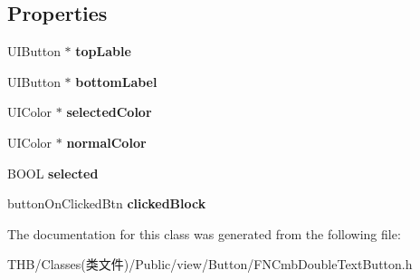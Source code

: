 \subsection*{Properties}
\begin{DoxyCompactItemize}
\item 
\mbox{\label{interface_f_n_cmb_double_text_button_af90e92dc486afb9f0e67654bdb69f14d}} 
U\+I\+Button $\ast$ {\bfseries top\+Lable}
\item 
\mbox{\label{interface_f_n_cmb_double_text_button_ac32549056770869dd4db3180583a424e}} 
U\+I\+Button $\ast$ {\bfseries bottom\+Label}
\item 
\mbox{\label{interface_f_n_cmb_double_text_button_a521c9c4870bb17fe0fa5a1dcaa2d993c}} 
U\+I\+Color $\ast$ {\bfseries selected\+Color}
\item 
\mbox{\label{interface_f_n_cmb_double_text_button_a856f45716a7156fd40bf46d1266c7673}} 
U\+I\+Color $\ast$ {\bfseries normal\+Color}
\item 
\mbox{\label{interface_f_n_cmb_double_text_button_a08b10eb4571b4d9844f07853c0d9b95c}} 
B\+O\+OL {\bfseries selected}
\item 
\mbox{\label{interface_f_n_cmb_double_text_button_a57770987c94d815708561faa60291265}} 
button\+On\+Clicked\+Btn {\bfseries clicked\+Block}
\end{DoxyCompactItemize}


The documentation for this class was generated from the following file\+:\begin{DoxyCompactItemize}
\item 
T\+H\+B/\+Classes(类文件)/\+Public/view/\+Button/F\+N\+Cmb\+Double\+Text\+Button.\+h\end{DoxyCompactItemize}
